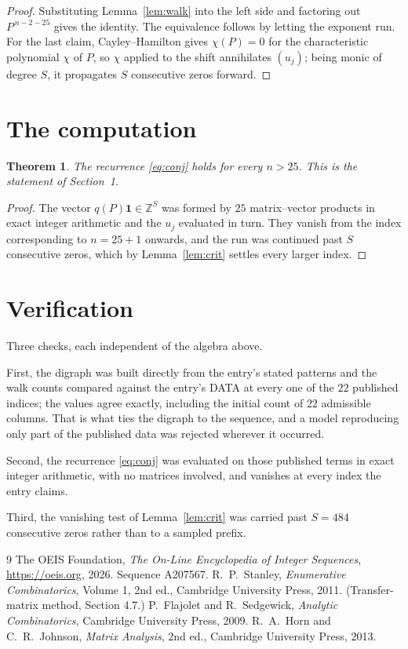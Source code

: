 \documentclass[11pt,a4paper]{article}
\theoremstyle{plain}
\newtheorem{theorem}{Theorem}
\theoremstyle{definition}
\begin{document}
\begin{proof}
Substituting Lemma~\ref{lem:walk} into the left side and factoring out
$P^{\,n-2-25}$ gives the identity. The equivalence follows by letting the exponent
run. For the last claim, Cayley--Hamilton gives $\chi(P)=0$ for the characteristic
polynomial $\chi$ of $P$, so $\chi$ applied to the shift annihilates $(u_j)$; being monic of
degree $S$, it propagates $S$ consecutive zeros forward.
\end{proof}

\section{The computation}

\begin{theorem}
The recurrence \eqref{eq:conj} holds for every $n>25$. This is the statement of
Section~1.
\end{theorem}

\begin{proof}
The vector $q(P)\mathbf{1}\in\mathbb{Z}^{S}$ was formed by $25$ matrix--vector
products in exact integer arithmetic and the $u_j$ evaluated in turn. They vanish from the
index corresponding to $n=25+1$ onwards, and the run was continued past $S$ consecutive
zeros, which by Lemma~\ref{lem:crit} settles every larger index.
\end{proof}

\section{Verification}

Three checks, each independent of the algebra above.

First, the digraph was built directly from the entry's stated patterns and the walk counts
compared against the entry's DATA at every one of the $22$ published indices; the
values agree exactly, including the initial count of $22$ admissible columns. That is
what ties the digraph to the sequence, and a model reproducing only part of the published
data was rejected wherever it occurred.

Second, the recurrence \eqref{eq:conj} was evaluated on those published terms in exact
integer arithmetic, with no matrices involved, and vanishes at every index the entry claims.

Third, the vanishing test of Lemma~\ref{lem:crit} was carried past $S=484$ consecutive
zeros rather than to a sampled prefix.

\begin{thebibliography}{9}
 The OEIS Foundation, \emph{The On-Line Encyclopedia of Integer
Sequences}, \url{https://oeis.org}, 2026. Sequence A207567.
 R.~P.~Stanley, \emph{Enumerative Combinatorics}, Volume 1, 2nd ed.,
Cambridge University Press, 2011. (Transfer-matrix method, Section 4.7.)
 P.~Flajolet and R.~Sedgewick, \emph{Analytic Combinatorics}, Cambridge
University Press, 2009.
 R.~A.~Horn and C.~R.~Johnson, \emph{Matrix Analysis}, 2nd ed., Cambridge
University Press, 2013.
\end{thebibliography}
\end{document}
